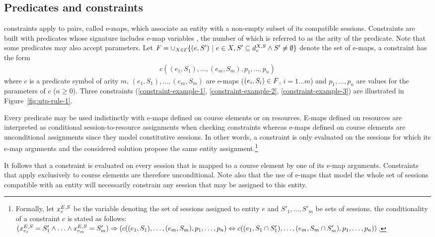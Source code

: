 \subsection{Predicates and constraints}
\label{sec:constraints}
{\UTP} constraints apply to pairs, called e-maps, which associate an entity with a non-empty subset of its compatible sessions.
Constraints are built with predicates whose signature includes e-map variables%
, the number of which is referred to as the arity of the predicate. 
Note that some predicates may also accept parameters.
Let 
${F}=
\cup_{X \in \mathcal{E}}\{(e,S')\ |\ e\in X,S'\subseteq d^{X,S}_{e}\wedge S'\neq\emptyset\}$
denote the set of e-maps,
a {\UTP} constraint has the form
\begin{align}
c((e_1,S_1),\ldots,(e_m,S_m),p_1,\ldots,p_n) \label{rule:constraint}
\end{align}
where 
$c$ is a predicate symbol of arity $m$,
$(e_1,S_1),\ldots,(e_m,S_m)$ are e-maps ($(e_i,S_i)\in{F}$, $i=1\ldots m$) 
and 
$p_1,\ldots,p_n$ are values for the parameters of $c$ ($n\geq0$).
Three constraints (\ref{constraint-example-1}, \ref{constraint-example-2}, \ref{constraint-example-3}) are illustrated in Figure~\ref{fig:utp-rule-1}.


Every predicate may be used indistinctly with e-maps defined on course elements or on resources.
E-maps defined on resources are interpreted as conditional session-to-resource assignments
when checking constraints 
whereas e-maps defined on course elements are unconditional assignments since they model constitutive sessions.
In other words, 
a constraint is only evaluated
on the sessions for which its e-map arguments and the considered solution propose the same entity assignment.\footnote{Formally, let $x^{E,S}_{e}$ be the variable denoting the set of sessions assigned to entity $e$ and $S'_1,\ldots,S'_m$ be sets of sessions, the conditionality of a constraint $c$ is stated as follows: 
$(x^{E,S}_{e_1}=S'_1 \wedge\ldots\wedge x^{E,S}_{e_m}=S'_m)
\Rightarrow
(c((e_1,S_1),\ldots,(e_m,S_m),p_1,\ldots,p_n)
\Leftrightarrow
c((e_1,S_1\cap S'_1),\ldots,(e_m,S_m\cap S'_m),p_1,\ldots,p_n))$.}

It follows that 
a constraint is evaluated on every session that is mapped to a course element by one of its e-map arguments.
Constraints that apply exclusively to course elements are therefore unconditional. 
Note also that the use of e-maps that model the whole set of sessions compatible with an entity 
will necessarily constrain any session that may be assigned to this entity.


